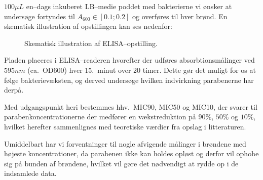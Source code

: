     $100\si{\mu L}$ en--dags inkuberet LB--medie poddet med bakterierne vi ønsker at undersøge fortyndes til $A_{600} \in \left[0.1;0.2\right]$ og overføres til hver brønd. En skematisk illustration af opstillingen kan ses nedenfor:
    \begin{figure}[H]\centering
        \caption{Skematisk illustration af ELISA--opstilling.}
    \end{figure}
    Pladen placeres i ELISA--readeren hvorefter der udføres absorbtionsmålinger ved $595\si{nm}$ (ca.\ OD600) hver 15.\ minut over 20 timer. Dette gør det muligt for os at følge bakterievæksten, og derved undersøge hvilken indvirkning parabenerne har derpå. 

    Med udgangspunkt heri bestemmes hhv.\ MIC90, MIC50 og MIC10, der svarer til parabenkoncentrationerne der medfører en vækstreduktion på $90\%$, $50\%$ og  $10\%$, hvilket herefter sammenlignes med teoretiske værdier fra opslag i litteraturen.

    Umiddelbart har vi forventninger til nogle afvigende målinger i brøndene med højeste koncentrationer, da parabenen ikke kan holdes opløst og derfor vil ophobe sig på bunden af brøndene, hvilket vil gøre det nødvendigt at rydde op i de indsamlede data.
